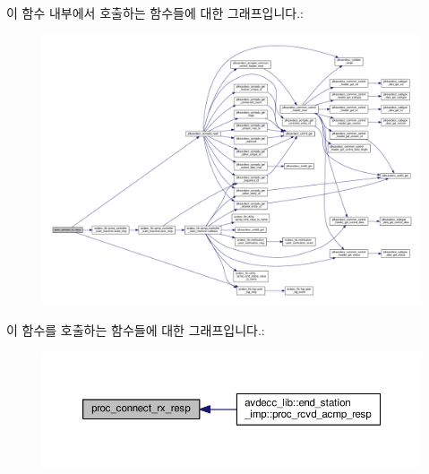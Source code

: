 이 함수 내부에서 호출하는 함수들에 대한 그래프입니다.\+:
\nopagebreak
\begin{figure}[H]
\begin{center}
\leavevmode
\includegraphics[width=350pt]{classavdecc__lib_1_1stream__input__descriptor__imp_ad7b49ee931f17f5d7a27123fb7cd6082_cgraph}
\end{center}
\end{figure}




이 함수를 호출하는 함수들에 대한 그래프입니다.\+:
\nopagebreak
\begin{figure}[H]
\begin{center}
\leavevmode
\includegraphics[width=350pt]{classavdecc__lib_1_1stream__input__descriptor__imp_ad7b49ee931f17f5d7a27123fb7cd6082_icgraph}
\end{center}
\end{figure}


